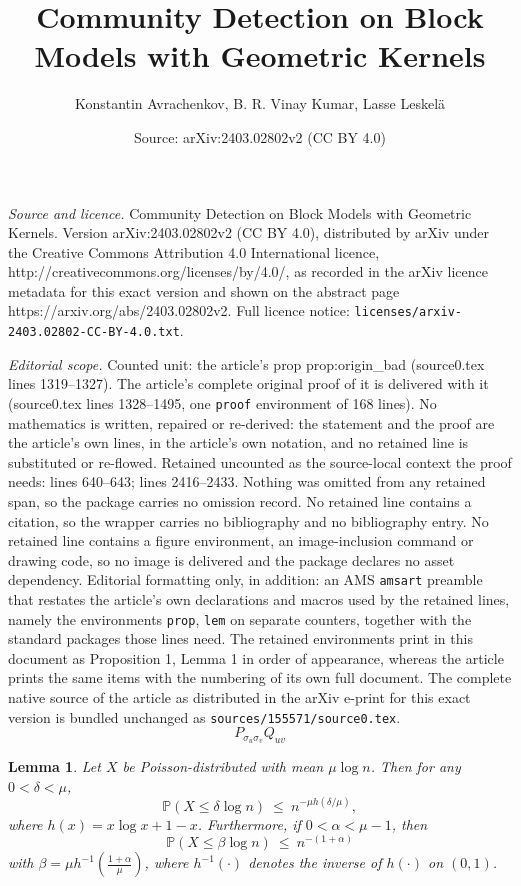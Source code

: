 \documentclass[10pt,a4paper]{amsart}
\title{Community Detection on Block Models with Geometric Kernels}
\author{Konstantin Avrachenkov, B. R. Vinay Kumar, Lasse Leskel\"a}
\date{Source: arXiv:2403.02802v2 (CC BY 4.0)}
\newtheorem{lem}{Lemma}
\def\P{\mathbb{P}}
\newcommand{\al}{\alpha}
\newcommand{\be}{\beta}
\newcommand{\de}{\delta}
\newcommand{\eps}{\epsilon}
\def\wle{ \ \le \ }
\begin{document}
\maketitle

\noindent\emph{Source and licence.} Community Detection on Block Models with Geometric Kernels. Version arXiv:2403.02802v2 (CC BY 4.0), distributed by arXiv under the Creative Commons Attribution 4.0 International licence, http://creativecommons.org/licenses/by/4.0/, as recorded in the arXiv licence metadata for this exact version and shown on the abstract page https://arxiv.org/abs/2403.02802v2. Full licence notice: \texttt{licenses/arxiv-2403.02802-CC-BY-4.0.txt}.\par\smallskip

\noindent\textit{Editorial scope.} Counted unit: the article's prop prop:origin\_bad (source0.tex lines 1319--1327). The article's complete original proof of it is delivered with it (source0.tex lines 1328--1495, one \texttt{proof} environment of 168 lines). No mathematics is written, repaired or re-derived: the statement and the proof are the article's own lines, in the article's own notation, and no retained line is substituted or re-flowed.  Retained uncounted as the source-local context the proof needs: lines 640--643; lines 2416--2433.  Nothing was omitted from any retained span, so the package carries no omission record.  No retained line contains a citation, so the wrapper carries no bibliography and no bibliography entry.  No retained line contains a figure environment, an image-inclusion command or drawing code, so no image is delivered and the package declares no asset dependency.  Editorial formatting only, in addition: an AMS \texttt{amsart} preamble that restates the article's own declarations and macros used by the retained lines, namely the environments \texttt{prop}, \texttt{lem} on separate counters, together with the standard packages those lines need.  The retained environments print in this document as Proposition 1, Lemma 1 in order of appearance, whereas the article prints the same items with the numbering of its own full document.  The complete native source of the article as distributed in the arXiv e-print for this exact version is bundled unchanged as \texttt{sources/155571/source0.tex}.
\begin{equation}
\label{eq:InteractionProduct}
P_{\sigma_u \sigma_v} Q_{uv}
\end{equation}

\begin{lem}
\label{lem:conc_poisson_new}
Let $X$ be Poisson-distributed with mean $\mu \log n$. Then for any $0 < \delta < \mu$,
\[
 \P( X \le \delta \log n )
 \wle n^{- \mu h(\de/\mu)},
\]
where
$h(x) = x \log x + 1 - x$.
Furthermore, if $0 < \al < \mu-1$, then
\[
 \P( X \le \be \log n )
 \wle n^{-(1 + \al)}
\]
with $\be = \mu h^{-1}( \frac{1+\al}{\mu} )$,
where $h^{-1}(\cdot)$ denotes the inverse of $h(\cdot)$ on $(0,1)$.
\end{lem}
\end{document}
